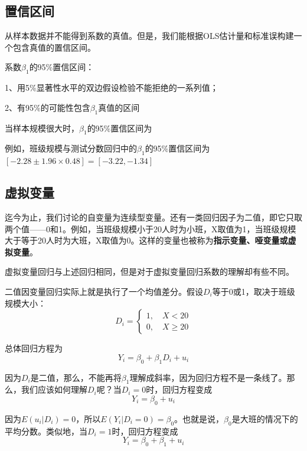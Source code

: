 \documentclass[cn,12pt,math=newtx,citestyle=gb7714-2015,bibstyle=gb7714-2015]{elegantbook}
\begin{document}
	\subsection{置信区间}
	从样本数据并不能得到系数的真值。但是，我们能根据OLS估计量和标准误构建一个包含真值的置信区间。
	
	系数$\beta_1$的95\%置信区间：
	
	1、用5\%显著性水平的双边假设检验不能拒绝的一系列值；
	
	2、有95\%的可能性包含$\beta_1$真值的区间
	
	当样本规模很大时，$\beta_1$的95\%置信区间为
	\begin{equation}
		[\hat{\beta}_1-1.96SE(\hat{\beta}_1),\hat{\beta}_1+1.96SE(\hat{\beta}_1)]
	\end{equation}
	
	例如，班级规模与测试分数回归中的$\beta_1$的95\%置信区间为$[-2.28\pm1.96\times0.48]=[-3.22,-1.34]$
	
	\subsection{虚拟变量}
	迄今为止，我们讨论的自变量为连续型变量。还有一类回归因子为二值，即它只取两个值——0和1。例如，当班级规模小于20人时为小班，X取值为1，当班级规模大于等于20人时为大班，X取值为0。这样的变量也被称为\textbf{指示变量、哑变量或虚拟变量}。
	
	虚拟变量回归与上述回归相同，但是对于虚拟变量回归系数的理解却有些不同。
	
	二值因变量回归实际上就是执行了一个均值差分。假设$D_i$等于0或1，取决于班级规模大小：
	\[ D_i=\begin{cases}
		1,\quad X<20 \\
		0,\quad X\geq20
	\end{cases} \]
	
	总体回归方程为
	\begin{equation}
		Y_i=\beta_0+\beta_1D_i+u_i
	\end{equation}
	
	因为$D_i$是二值，那么，不能再将$\beta_1$理解成斜率，因为回归方程不是一条线了。那么，我们应该如何理解$D_i$呢？当$D_i=0$时，回归方程变成
	\begin{equation}
		Y_i=\beta_0+u_i
	\end{equation}
	
	因为$E(u_i|D_i)=0$，所以$E(Y_i|D_i=0)=\beta_0$。也就是说，$\beta_0$是大班的情况下的平均分数。类似地，当$D_i=1$时，回归方程变成
	\begin{equation}
		Y_i=\beta_0+\beta_1+u_i
	\end{equation}
	
\end{document}
